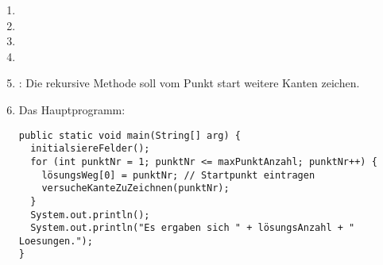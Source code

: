 \documentclass{bschlangaul-aufgabe}
\begin{document}
\begin{enumerate}
\item {}
\item {}
\item {}
\item {}
\item {}: Die rekursive
Methode soll vom Punkt start weitere Kanten zeichen.

\item Das Hauptprogramm:

\begin{verbatim}
public static void main(String[] arg) {
  initialsiereFelder();
  for (int punktNr = 1; punktNr <= maxPunktAnzahl; punktNr++) {
    lösungsWeg[0] = punktNr; // Startpunkt eintragen
    versucheKanteZuZeichnen(punktNr);
  }
  System.out.println();
  System.out.println("Es ergaben sich " + lösungsAnzahl + " Loesungen.");
}
\end{verbatim}

\end{enumerate}

\end{document}
